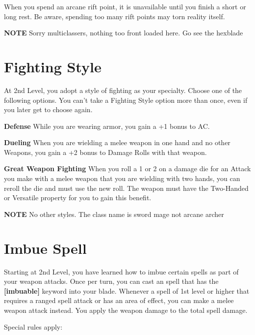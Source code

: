 \begin{multicols*}{2}
When you spend an arcane rift point, it is unavailable until you finish a short or long rest. Be aware, spending too many rift points may torn reality itself. 

\smallskip

{\color{red} \textbf{NOTE} Sorry multiclassers, nothing too front loaded here. Go see the hexblade}
   
\section*{Fighting Style} 

At 2nd Level, you adopt a style of fighting as your specialty. Choose one of the following options. You can’t take a Fighting Style option more than once, even if you later get to choose again.

\textbf{Defense}
While you are wearing armor, you gain a +1 bonus to AC.

\textbf{Dueling}
When you are wielding a melee weapon in one hand and no other Weapons, you gain a +2 bonus to Damage Rolls with that weapon.

\textbf{Great Weapon Fighting}
When you roll a 1 or 2 on a damage die for an Attack you make with a melee weapon that you are wielding with two hands, you can reroll the die and must use the new roll. The weapon must have the Two-Handed or Versatile property for you to gain this benefit.

\smallskip

{\color{red} \textbf{NOTE} No other styles. The class name is sword mage not arcane archer }


    

\section*{Imbue Spell}

Starting at 2nd Level, you have learned how to imbue certain spells as part of your weapon attacks. 
Once per turn, you can cast an spell that has the \textbf{[imbuable]} keyword into your blade. Whenever a spell of 1st level or higher that requires a ranged spell attack or has an area of effect, you can make a melee weapon attack instead. You apply the weapon damage to the total spell damage. 

Special rules apply:




\end{multicols*}
